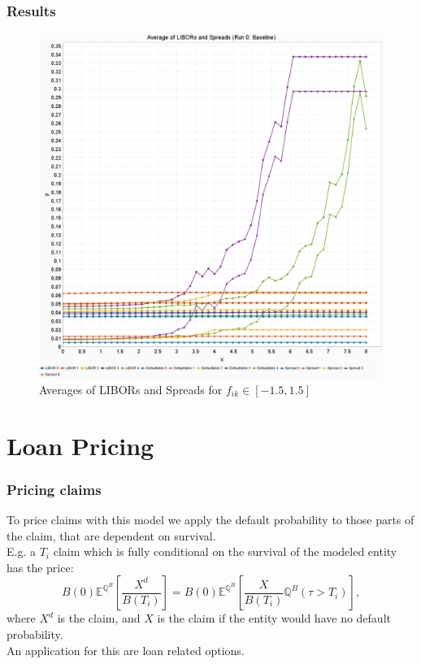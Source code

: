 \documentclass{beamer}
\begin{document}
	\begin{frame}
		\frametitle{Results}
		\begin{figure}
			\centering
			\includegraphics[height=0.6\textheight]{VorstellungPics/FreeParamsRange15}
			\caption[]{Averages of LIBORs and Spreads for $f_{i k} \in [-1.5, 1.5]$}
			\label{fig:freeparamsrange15}
		\end{figure}
		
		
	\end{frame}
	
	\section{Loan Pricing}\label{sectLoans}
	
	\begin{frame}
	\frametitle{\nameref{sectLoans}}
	\tableofcontents[ 
	currentsection, 
	sectionstyle=show/shaded, 
	subsectionstyle=show/shaded, 
	] 
	\end{frame}
	
	\begin{frame}
		\frametitle{Pricing claims}
		To price claims with this model we apply the default probability to those parts of the claim, that are dependent on survival.\\
		
		E.g. a $T_i$ claim which is fully conditional on the survival of the modeled entity has the price:
		\[
		B(0)\mathbb{E}^{\mathbb{Q}^B}\left[\frac{X^d}{B(T_i)}\right] = B(0)\mathbb{E}^{\mathbb{Q}^B}\left[\frac{X}{B(T_i)}\mathbb{Q}^B(\tau > T_i)\right],
		\]
		where $X^d$ is the claim, and $X$ is the claim if the entity would have no default probability.\\
		An application for this are loan related options.
	\end{frame}
	
\end{document}
